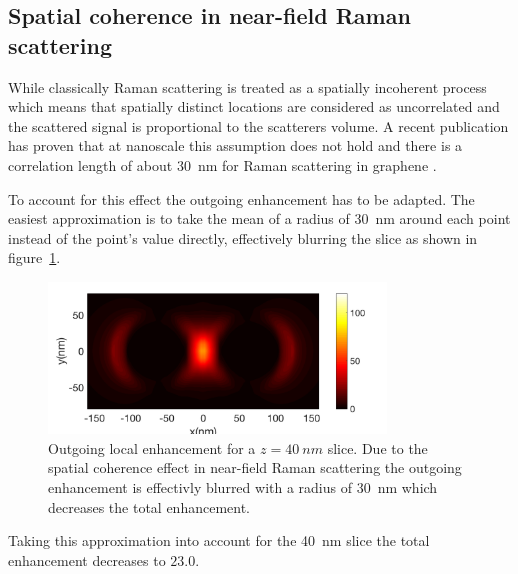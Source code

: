 \subsection{Spatial coherence in near-field Raman scattering}

While classically Raman scattering is treated as a spatially incoherent process which means that spatially distinct locations are considered as uncorrelated and the scattered signal is proportional to the scatterers volume. A recent publication has proven that at nanoscale this assumption does not hold and there is a correlation length of about \SI{30}{nm} for Raman scattering in graphene \cite{coherence}.

To account for this effect the outgoing enhancement has to be adapted. The easiest approximation is to take the mean of a radius of \SI{30}{nm} around each point instead of the point's value directly, effectively blurring the slice as shown in figure~\ref{fig:coherence}.

\begin{figure}[!h]
  \centering
  \includegraphics[width=0.8\textwidth]{./images/coherence.png}
  \caption{Outgoing local enhancement for a $z=\SI{40}{nm}$ slice. Due to the spatial coherence effect in near-field Raman scattering the outgoing enhancement is effectivly blurred with a radius of \SI{30}{nm} which decreases the total enhancement.}
  \label{fig:coherence}
\end{figure}

Taking this approximation into account for the \SI{40}{nm} slice the total enhancement decreases to $23.0$.
